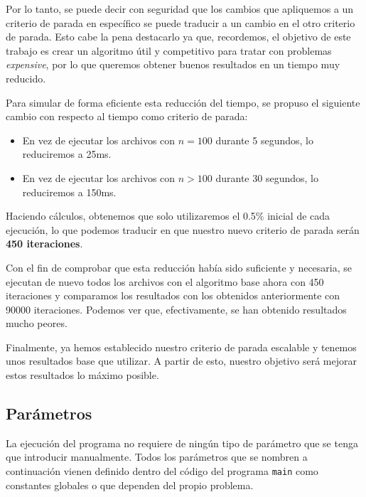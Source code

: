 Por lo tanto, se puede decir con seguridad que los cambios que apliquemos a un criterio de parada en específico se puede traducir a un cambio en el otro criterio de parada. 
Esto cabe la pena destacarlo ya que, recordemos, el objetivo de este trabajo es crear un algoritmo útil y competitivo para tratar con problemas \textit{expensive}, por lo que queremos obtener buenos resultados en un tiempo muy reducido. 

Para simular de forma eficiente esta reducción del tiempo, se propuso el siguiente cambio con respecto al tiempo como criterio de parada:
\begin{itemize}
	\item En vez de ejecutar los archivos con $n=100$ durante 5 segundos, lo reduciremos a 25ms.
	\item En vez de ejecutar los archivos con $n>100$ durante 30 segundos, lo reduciremos a 150ms.
\end{itemize}
Haciendo cálculos, obtenemos que solo utilizaremos el 0.5\% inicial de cada ejecución, lo que podemos traducir en que nuestro nuevo criterio de parada serán \textbf{450 iteraciones}. 

Con el fin de comprobar que esta reducción había sido suficiente y necesaria, se ejecutan de nuevo todos los archivos con el algoritmo base ahora con 450 iteraciones y comparamos los resultados con los obtenidos anteriormente con 90000 iteraciones. 
Podemos ver que, efectivamente, se han obtenido resultados mucho peores. 

Finalmente, ya hemos establecido nuestro criterio de parada escalable y tenemos unos resultados base que utilizar. 
A partir de esto, nuestro objetivo será mejorar estos resultados lo máximo posible.

\subsection{Parámetros}

La ejecución del programa no requiere de ningún tipo de parámetro que se tenga que introducir manualmente. 
Todos los parámetros que se nombren a continuación vienen definido dentro del código del programa \texttt{main} como constantes globales o que dependen del propio problema. 

